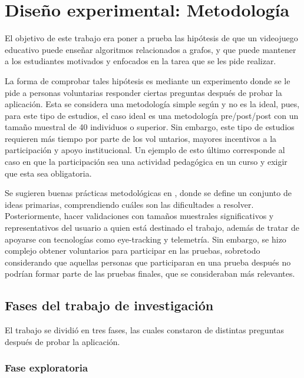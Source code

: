 \chapter{Diseño experimental: Metodología}

El objetivo de este trabajo era poner a prueba las hipótesis de que un videojuego educativo puede enseñar algoritmos relacionados a grafos, y que puede mantener a los estudiantes motivados y enfocados en la tarea que se les pide realizar. 

La forma de comprobar tales hipótesis es mediante un experimento donde se le pide a personas voluntarias responder ciertas preguntas después de probar la aplicación. Esta se considera una metodología simple según \cite{HowGamesComputingEducationEvaluated} y no es la ideal, pues, para este tipo de estudios, el caso ideal es una metodología pre/post/post con un tamaño muestral de 40 individuos o superior. Sin embargo, este tipo de estudios requieren más tiempo por parte de los vol untarios, mayores incentivos a la participación y apoyo institucional. Un ejemplo de esto último corresponde al caso en que la participación sea una actividad pedagógica en un curso y exigir que esta sea obligatoria.

Se sugieren buenas prácticas metodológicas en \cite{Rogers2002InteractionDB, MeegaPlusManual, HowGamesComputingEducationEvaluated}, donde se define un conjunto de ideas primarias, comprendiendo cuáles son las dificultades a resolver. Posteriormente, hacer validaciones con tamaños muestrales significativos y representativos del usuario a quien está destinado el trabajo, además de tratar de apoyarse con tecnologías como eye-tracking y telemetría. Sin embargo, se hizo complejo obtener voluntarios para participar en las pruebas, sobretodo considerando que aquellas personas que participaran en una prueba después no podrían formar parte de las pruebas finales, que se consideraban más relevantes.


\section{Fases del trabajo de investigación}

El trabajo se dividió en tres fases, las cuales constaron de distintas preguntas después de probar la aplicación.

\subsection{Fase exploratoria}

